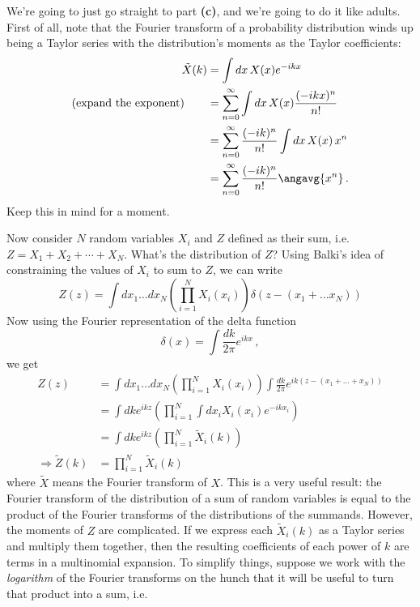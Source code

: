 We're going to just go straight to part \textbf{(c)}, and we're going to do it like adults.
First of all, note that the Fourier transform of a probability distribution winds up being a Taylor series with the distribution's moments as the Taylor coefficients:
\begin{align*}
  \tilde{X}(k) &= \int dx \, X(x) e^{-i k x} \\
  \text{(expand the exponent)} \qquad
  &= \sum_{n=0}^\infty \int dx \, X(x) \frac{(-i k x)^n}{n!} \\
  &= \sum_{n=0}^\infty \frac{(-i k)^n}{n!} \int dx \, X(x) \, x^n \\
  &= \sum_{n=0}^\infty \frac{(-i k)^n}{n!} \angavg{x^n}
  \, .
\end{align*}
Keep this in mind for a moment.

Now consider $N$ random variables ${X_i}$ and $Z$ defined as their sum, i.e. $Z = X_1 + X_2 + \cdots + X_N$.
What's the distribution of $Z$?
Using Balki's idea of constraining the values of $X_i$ to sum to $Z$, we can write
\begin{equation*}
  Z(z) = \int dx_1 \ldots dx_N \left( \prod_{i=1}^N X_i(x_i) \right) \delta(z - (x_1 + \ldots x_N))
\end{equation*}
Now using the Fourier representation of the delta function
\begin{equation*}
  \delta(x) = \int \frac{dk}{2\pi} e^{i k x}
  \, ,
\end{equation*}
we get
\begin{align*}
  Z(z)
  &= \int dx_1 \ldots dx_N \left( \prod_{i=1}^N X_i(x_i) \right) \int \frac{dk}{2\pi} e^{i k (z - (x_1 + \ldots + x_N))} \\
  &= \int dk e^{i k z} \left( \prod_{i=1}^N \int dx_i X_i(x_i) e^{-i k x_i} \right) \\
  &= \int dk e^{i k z} \left( \prod_{i=1}^N \tilde{X}_i(k) \right) \\
  \Rightarrow \tilde{Z}(k) &= \prod_{i=1}^N \tilde{X}_i(k)
\end{align*}
where $\tilde{X}$ means the Fourier transform of $X$.
This is a very useful result: the Fourier transform of the distribution of a sum of random variables is equal to the product of the Fourier transforms of the distributions of the summands.
However, the moments of $Z$ are complicated.
If we express each $\tilde{X}_i(k)$ as a Taylor series and multiply them together, then the resulting coefficients of each power of $k$ are terms in a multinomial expansion.
To simplify things, suppose we work with the \emph{logarithm} of the Fourier transforms on the hunch that it will be useful to turn that product into a sum, i.e.
